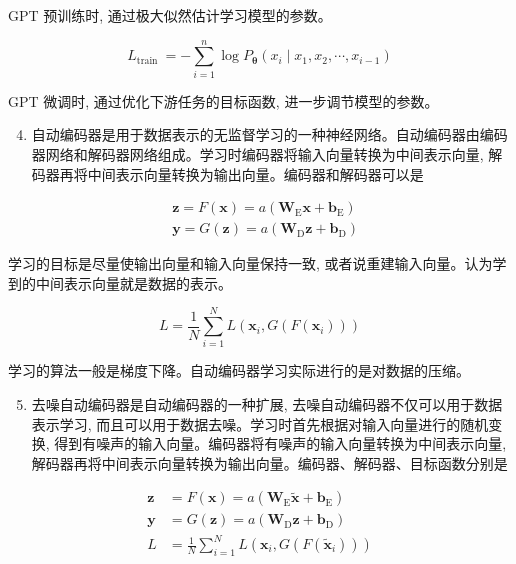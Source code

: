 \documentclass[10pt]{article}
\begin{document}
GPT 预训练时, 通过极大似然估计学习模型的参数。

$$
L_{\text {train }}=-\sum_{i=1}^{n} \log P_{\boldsymbol{\theta}}\left(x_{i} \mid x_{1}, x_{2}, \cdots, x_{i-1}\right)
$$

GPT 微调时, 通过优化下游任务的目标函数, 进一步调节模型的参数。

\begin{enumerate}
  \setcounter{enumi}{3}
  \item 自动编码器是用于数据表示的无监督学习的一种神经网络。自动编码器由编码器网络和解码器网络组成。学习时编码器将输入向量转换为中间表示向量, 解码器再将中间表示向量转换为输出向量。编码器和解码器可以是
\end{enumerate}

$$
\begin{aligned}
& \boldsymbol{z}=F(\boldsymbol{x})=a\left(\boldsymbol{W}_{\mathrm{E}} \boldsymbol{x}+\boldsymbol{b}_{\mathrm{E}}\right) \\
& \boldsymbol{y}=G(\boldsymbol{z})=a\left(\boldsymbol{W}_{\mathrm{D}} \boldsymbol{z}+\boldsymbol{b}_{\mathrm{D}}\right)
\end{aligned}
$$

学习的目标是尽量使输出向量和输入向量保持一致, 或者说重建输入向量。认为学到的中间表示向量就是数据的表示。

$$
L=\frac{1}{N} \sum_{i=1}^{N} L\left(\boldsymbol{x}_{i}, G\left(F\left(\boldsymbol{x}_{i}\right)\right)\right)
$$

学习的算法一般是梯度下降。自动编码器学习实际进行的是对数据的压缩。

\begin{enumerate}
  \setcounter{enumi}{4}
  \item 去噪自动编码器是自动编码器的一种扩展, 去噪自动编码器不仅可以用于数据表示学习, 而且可以用于数据去噪。学习时首先根据对输入向量进行的随机变换, 得到有噪声的输入向量。编码器将有噪声的输入向量转换为中间表示向量, 解码器再将中间表示向量转换为输出向量。编码器、解码器、目标函数分别是
\end{enumerate}

$$
\begin{aligned}
\boldsymbol{z} & =F(\boldsymbol{x})=a\left(\boldsymbol{W}_{\mathrm{E}} \tilde{\boldsymbol{x}}+\boldsymbol{b}_{\mathrm{E}}\right) \\
\boldsymbol{y} & =G(\boldsymbol{z})=a\left(\boldsymbol{W}_{\mathrm{D}} \boldsymbol{z}+\boldsymbol{b}_{\mathrm{D}}\right) \\
L & =\frac{1}{N} \sum_{i=1}^{N} L\left(\boldsymbol{x}_{i}, G\left(F\left(\tilde{\boldsymbol{x}}_{i}\right)\right)\right)
\end{aligned}
$$
\end{document}

